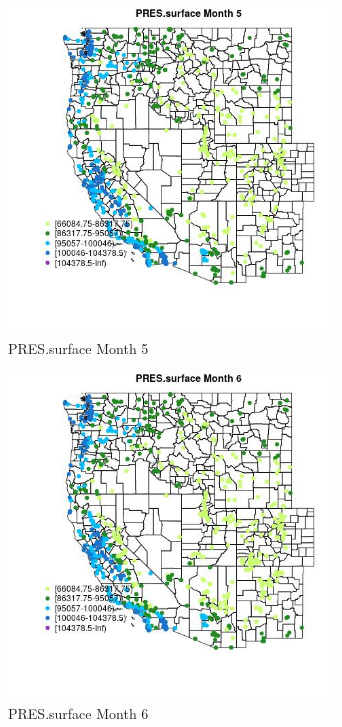\begin{figure} 
\centering  
\includegraphics[width=0.77\textwidth]{Code_Outputs/Report_ML_input_PM25_Step4_part_f_de_duplicated_aveswNAs_MapObsMo5PRESsurface.jpg} 
\caption{\label{fig:Report_ML_input_PM25_Step4_part_f_de_duplicated_aveswNAsMapObsMo5PRESsurface}PRES.surface Month 5} 
\end{figure} 
 

\begin{figure} 
\centering  
\includegraphics[width=0.77\textwidth]{Code_Outputs/Report_ML_input_PM25_Step4_part_f_de_duplicated_aveswNAs_MapObsMo6PRESsurface.jpg} 
\caption{\label{fig:Report_ML_input_PM25_Step4_part_f_de_duplicated_aveswNAsMapObsMo6PRESsurface}PRES.surface Month 6} 
\end{figure} 
 

